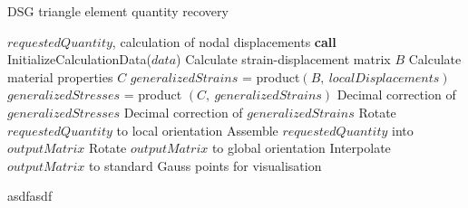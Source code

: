 \begin{algorithm}
	\onehalfspacing
	\caption{DSG triangle element quantity recovery}\label{euclid}
	\begin{algorithmic}[H]
		\Require $requestedQuantity$, calculation of nodal displacements
		\State \textbf{call} InitializeCalculationData({$data$})
				\State \hspace{\algorithmicindent}Calculate strain-displacement matrix $B$
				\State \hspace{\algorithmicindent}Calculate material properties $C$
				\State $generalizedStrains$ = product$(B,\ localDisplacements)$
						\State $generalizedStresses$ = product $(C,\ generalizedStrains)$
						\State Decimal correction of $generalizedStresses$
				\EndIf
				\State Decimal correction of $generalizedStrains$ 
						\State Rotate $requestedQuantity$ to local orientation
				\EndIf
				\State Assemble $requestedQuantity$ into $outputMatrix$
						\State Rotate $outputMatrix$ to global orientation
				\EndIf
				\State Interpolate $outputMatrix$ to standard Gauss points for visualisation
		\EndWhile
	\end{algorithmic}
\end{algorithm}

asdfasdf









